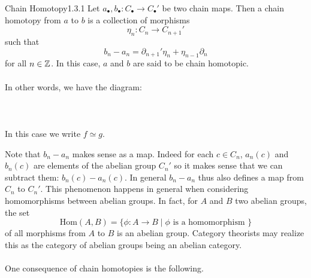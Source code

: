 \documentclass[a4paper]{article}
\begin{document}
\begin{defn}{Chain Homotopy}{1.3.1} Let $a_\bullet,b_\bullet:C_\bullet\to C_\bullet'$ be two chain maps. Then a chain homotopy from $a$ to $b$ is a collection of morphisms $$\eta_n:C_n\to C_{n+1}'$$ such that $$b_n-a_n=\partial_{n+1}'\eta_n+\eta_{n-1}\partial_n$$ for all $n\in\mathbb{Z}$. In this case, $a$ and $b$ are said to be chain homotopic. \\~\\
In other words, we have the diagram: \\~\\
\\~\\

In this case we write $f\simeq g$. 
\end{defn}

Note that $b_n-a_n$ makes sense as a map. Indeed for each $c\in C_n$, $a_n(c)$ and $b_n(c)$ are elements of the abelian group $C_n'$ so it makes sense that we can subtract them: $b_n(c)-a_n(c)$. In general $b_n-a_n$ thus also defines a map from $C_n$ to $C_n'$. This phenomenon happens in general when considering homomorphisms between abelian groups. In fact, for $A$ and $B$ two abelian groups, the set $$\text{Hom}(A,B)=\{\phi:A\to B\;|\;\phi\text{ is a homomorphism }\}$$ of all morphisms from $A$ to $B$ is an abelian group. Category theorists may realize this as the category of abelian groups being an abelian category. \\~\\

One consequence of chain homotopies is the following. 
\end{document}
